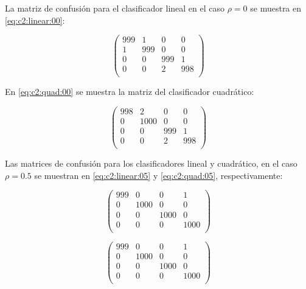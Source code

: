 \documentclass[11pt]{article} %
\begin{document}
La matriz de confusión para el clasificador lineal en el caso $\rho = 0$ se muestra en \eqref{eq:c2:linear:00}:

\begin{equation} \label{eq:c2:linear:00}
\left( \begin{array}{cccc}
999 & 1 & 0 & 0 \\
1 & 999 & 0 & 0 \\
0 & 0 & 999 & 1 \\
0 & 0 & 2 & 998 \\ 
\end{array} \right)
\end{equation}

En \eqref{eq:c2:quad:00} se muestra la matriz del clasificador cuadrático:

\begin{equation} \label{eq:c2:quad:00}
\left( \begin{array}{cccc}
998 & 2 & 0 & 0 \\
0 & 1000 & 0 &0 \\
0 & 0 & 999 & 1 \\
0 & 0 & 2 & 998 \\ 
\end{array} \right)
\end{equation}

Las matrices de confusión para los clasificadores lineal y cuadrático, en el caso $\rho = 0.5$ se muestran en \eqref{eq:c2:linear:05} y \eqref{eq:c2:quad:05}, respectivamente:

\begin{equation} \label{eq:c2:linear:05}
\left( \begin{array}{cccc}
999 & 0 & 0 & 1 \\
0 & 1000 & 0 & 0 \\
0 & 0 & 1000 & 0 \\
0 & 0 & 0 & 1000 \\ 
\end{array} \right)
\end{equation}

\begin{equation} \label{eq:c2:quad:05}
\left( \begin{array}{cccc}
999 & 0 & 0 & 1 \\
0 & 1000 & 0 & 0 \\
0 & 0 & 1000 & 0 \\
0 & 0 & 0 & 1000 \\ 
\end{array} \right)
\end{equation}
\end{document}
